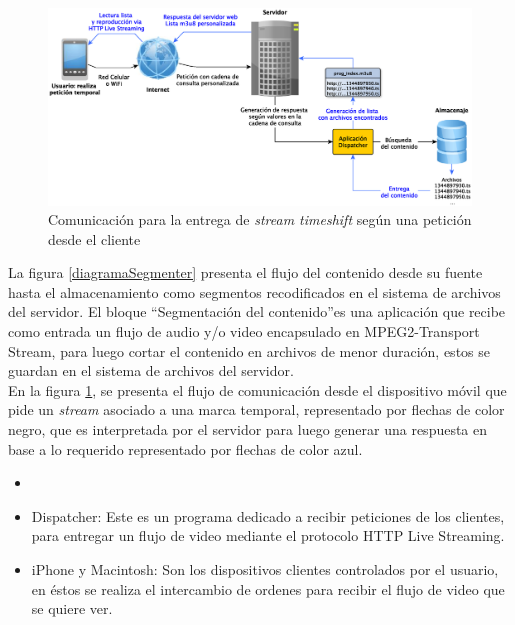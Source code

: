 \begin{figure}[H]
	\centering
	\includegraphics[scale=0.42]{imgs/diagrama-Dispatcher-Tedit.eps}
	\caption{Comunicación para la entrega de \textit{stream timeshift} según una petición desde el cliente}
	\label{diagramaGral}
\end{figure}

La figura \ref{diagramaSegmenter} presenta el flujo del contenido desde su fuente hasta el almacenamiento como segmentos recodificados en el sistema de archivos del servidor. El bloque \textquotedblleft Segmentación del contenido\textquotedblright es una aplicación que recibe como entrada un flujo de audio y/o video encapsulado en MPEG2-Transport Stream, para luego cortar el contenido en archivos de menor duración, estos se guardan en el sistema de archivos del servidor.\\

En la figura \ref{diagramaGral}, se presenta el flujo de comunicación desde el dispositivo móvil que pide un \textit{stream} asociado a una marca temporal, representado por flechas de color negro, que es interpretada por el servidor para luego generar una respuesta en base a lo requerido representado por flechas de color azul.

\begin{itemize}
\item 
\item Dispatcher: Este es un programa dedicado a recibir peticiones de los clientes, para entregar un flujo de video mediante el protocolo HTTP Live Streaming.
\item iPhone y Macintosh: Son los dispositivos clientes controlados por el usuario, en éstos se realiza el intercambio de ordenes para recibir el flujo de video que se quiere ver.
\end{itemize}

